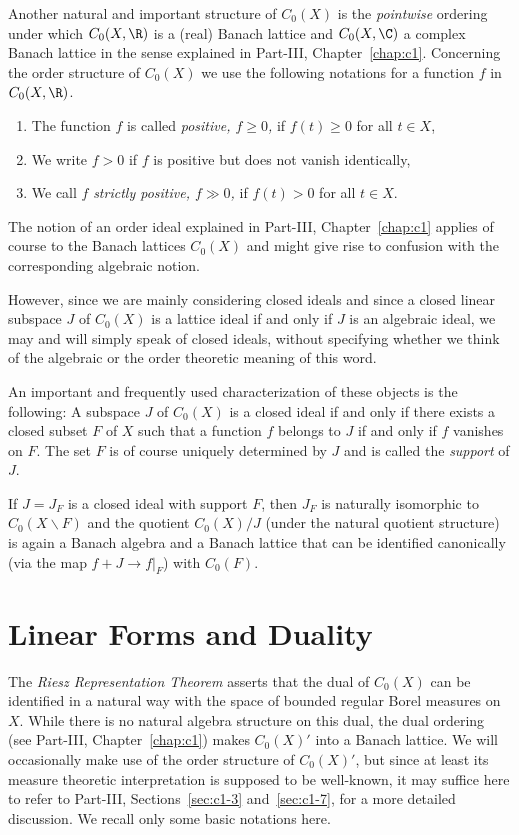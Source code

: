 Another natural and important structure of\/ $C_{0}(X)$ is the \emph{pointwise} ordering under which $C_{0}(X,\R)$ is a (real) Banach lattice and $C_{0}(X,\C)$ a complex Banach lattice in the sense explained in Part-III, Chapter~\ref{chap:c1}.
Concerning the order structure of\/ $C_{0}(X)$ we use the following notations for a function $f$ in $C_{0}(X,\R)$.
\begin{enumerate}[\upshape (i), labelindent=.25em]
\item
The function $ f $ is called \emph{positive, $ f \geq 0 $,} if\/ $ f(t) \geq 0  $ for all $ t \in X $, 

\item
We write $f>0$ if\/ $ f $ is positive but does not vanish identically,

\item
We call $ f $ \emph{strictly positive, $f \gg 0$,}  if\/ $ f(t) > 0 $ for all $ t \in X $.

\end{enumerate}
The notion of an order ideal explained in Part-III, Chapter~\ref{chap:c1} applies of course to the Banach lattices $C_{0}(X)$ and might give rise to confusion with the corresponding algebraic notion.

However, since we are mainly considering closed ideals and since a closed linear subspace $J$ of\/ $C_{0}(X)$ is a lattice ideal if and only if\/ $J$ is an algebraic ideal, we may and will simply speak of closed ideals, without specifying whether we think of the algebraic or the order theoretic meaning of this word.

An important and frequently used characterization of these objects is the following: A subspace $J$ of\/ $C_{0}(X)$ is a closed ideal if and only if there exists a closed subset $F$ of\/ $X$ such that a function $f$ belongs to $J$ if and only if\/ $f$ vanishes on $F$.
The set $F$ is of course uniquely determined by $J$ and is called the \emph{support} of\/ $J$.

If\/ $J = J_{F}$ is a closed ideal with support $F$, then $J_{F}$ is naturally isomorphic to $C_{0}(X\backslash F)$ and the quotient $C_{0}(X)/J$ (under the natural quotient structure) is again a Banach algebra and a Banach lattice that can be identified canonically (via the map $f + J \to f\vert_{F}$) with $C_{0}(F)$.
\section{Linear Forms and Duality}\label{sec:b1-2}%
The \emph{Riesz Representation Theorem} asserts that the dual of\/ $C_{0}(X)$ can be identified in a natural way with the space of bounded regular Borel measures on $X$.
While there is no natural algebra structure on this dual, the dual ordering (see Part-III, Chapter~\ref{chap:c1}) makes $C_{0}(X)'$ into a Banach lattice.
We will occasionally make use of the order structure of\/ $C_{0}(X)'$, but since at least its measure theoretic interpretation is supposed to be well-known, it may suffice here to refer to Part-III,
Sections~\ref{sec:c1-3} and~\ref{sec:c1-7}, for a more detailed discussion.
We recall only some basic notations here.

